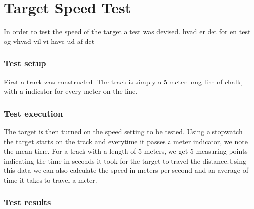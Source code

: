 \chapter{Target Speed Test}\label{speedotesto}
In order to test the speed of the target a test was devised.
hvad er det for en test og vhvad vil vi have ud af det
\subsection{Test setup}
First a track was constructed. The track is simply a 5 meter long line of chalk,
with a indicator for every meter on the line.
\subsection{Test execution}
The target is then turned on the speed setting to be tested. Using a stopwatch
the target starts on the track and everytime it passes a meter indicator, we note
the mean-time. For a track with a length of 5 meters, we get 5 measuring points indicating
the time in seconds it took for the target to travel the distance.Using this data
we can also calculate the speed in meters per second and an average of time it takes to
travel a meter.
\subsection{Test results}


